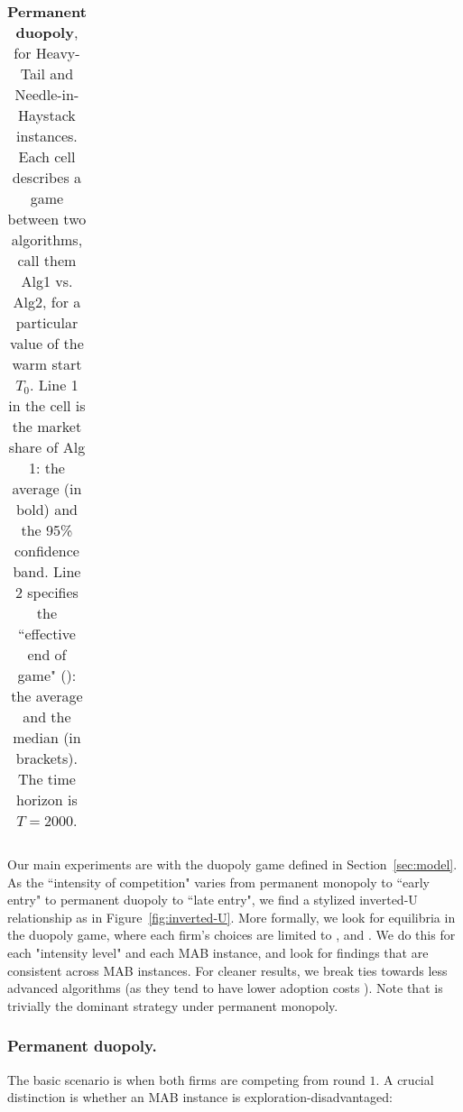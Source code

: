 \documentclass[../competing_bandits.tex]{subfiles}
\begin{document}
\begin{table*}[t]
\begin{tabular}{|c|c|c|c||c|c|c|}
  \\
   \hline
\end{tabular}
\caption{{\bf Permanent duopoly}, for Heavy-Tail and Needle-in-Haystack instances. Each cell describes a game between two algorithms, call them Alg1 vs. Alg2, for a particular value of the warm start $T_0$. Line 1 in the cell is the market share of Alg 1: the average (in bold) and the 95\% confidence band.
Line 2 specifies the ``effective end of game" (\Eeog): the average and the median (in brackets). The time horizon is $T=2000$.}
\label{sim_table}
\end{table*}

Our main experiments are with the duopoly game defined in Section~\ref{sec:model}. As the ``intensity of competition" varies from permanent monopoly to ``early entry" to permanent duopoly to ``late entry", we find a stylized inverted-U relationship as in Figure~\ref{fig:inverted-U}. More formally, we look for equilibria in the duopoly game, where each firm's choices are limited to \DG, \DEG and \TS. We do this for each "intensity level" and each MAB instance, and look for findings that are consistent across MAB instances. For cleaner results, we break ties towards less advanced algorithms (as they tend to have lower adoption costs \cite{MWT-WhitePaper-2016,DS-arxiv}). Note that \DG is trivially the dominant strategy under permanent monopoly.



\subsubsection{Permanent duopoly.}
The basic scenario is when both firms are competing from round $1$. A crucial distinction is whether an MAB instance is exploration-disadvantaged:
\end{document}
